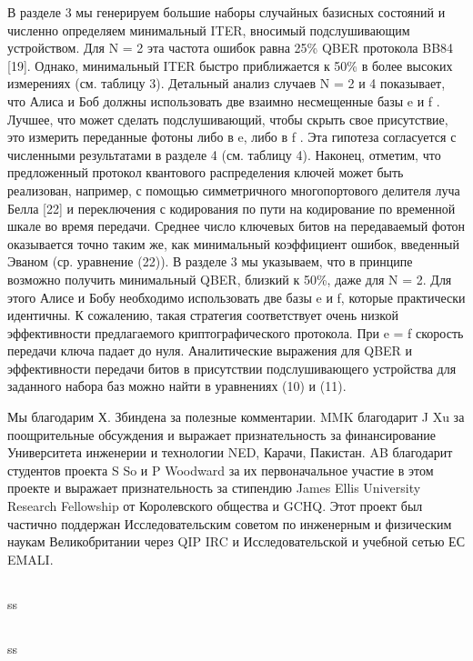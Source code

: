В разделе 3 мы генерируем большие наборы случайных базисных состояний и численно определяем минимальный ITER, вносимый подслушивающим устройством. Для N = 2 эта частота ошибок равна 25\% QBER протокола BB84 [19]. Однако, минимальный ITER быстро приближается к 50\% в более высоких измерениях (см. таблицу 3). Детальный анализ случаев N = 2 и 4 показывает, что Алиса и Боб должны использовать две взаимно несмещенные базы e и f . Лучшее, что может сделать подслушивающий, чтобы скрыть свое присутствие, это измерить переданные фотоны либо в e, либо в f . Эта гипотеза согласуется с численными результатами в разделе 4 (см. таблицу 4). Наконец, отметим, что предложенный протокол квантового распределения ключей может быть реализован, например, с помощью симметричного многопортового делителя луча Белла [22] и переключения с кодирования по пути на кодирование по временной шкале во время передачи. Среднее число ключевых битов на передаваемый фотон оказывается точно таким же, как минимальный коэффициент ошибок, введенный Эваном (ср. уравнение (22)).
В разделе 3 мы указываем, что в принципе возможно получить минимальный QBER, близкий к 50\%, даже для N = 2. Для этого Алисе и Бобу необходимо использовать две базы e и f, которые практически идентичны. К сожалению, такая стратегия соответствует очень низкой эффективности предлагаемого криптографического протокола. При e = f скорость передачи ключа падает до нуля. Аналитические выражения для QBER и эффективности передачи битов в присутствии подслушивающего устройства для заданного набора баз можно найти в уравнениях (10) и (11).

Мы благодарим Х. Збиндена за полезные комментарии. MMK благодарит J Xu за поощрительные обсуждения и выражает признательность за финансирование Университета инженерии и технологии NED, Карачи, Пакистан. AB благодарит студентов проекта S So и P Woodward за их первоначальное участие в этом проекте и выражает признательность за стипендию James Ellis University Research Fellowship от Королевского общества и GCHQ. Этот проект был частично поддержан Исследовательским советом по инженерным и физическим наукам Великобритании через QIP IRC и Исследовательской и учебной сетью ЕС EMALI.
\subsection{\review}
ss
\subsection{\dic}
ss